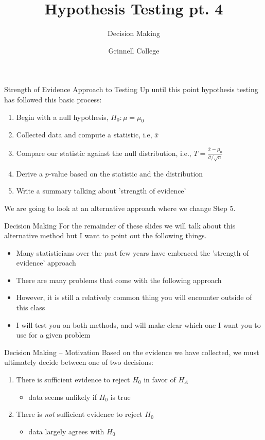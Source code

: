\documentclass{beamer}
\title[Introduction to Statistics]{Hypothesis Testing pt. 4}
\subtitle{Decision Making}
\author{Grinnell College}
\date{}
\begin{document}
\begin{frame}
  \titlepage
\end{frame}

\begin{frame}{Strength of Evidence Approach to Testing}
Up until this point hypothesis testing has followed this basic process:

\begin{enumerate}
\item Begin with a null hypothesis, $H_0: \mu = \mu_0$
\item Collected data and compute a statistic, i.e, $\overline{x}$
\item Compare our statistic against the null distribution, i.e., $T = \frac{\overline{x} - \mu_0}{\hat{\sigma}/\sqrt{n}}$
\item Derive a $p$-value based on the statistic and the distribution
\item Write a summary talking about 'strength of evidence'
\end{enumerate} \vspace{8mm}

We are going to look at an alternative approach where we change Step 5.
\end{frame}

\begin{frame}{Decision Making}
For the remainder of these slides we will talk about this alternative method but I want to point out the following things.
\begin{itemize}
    \item Many statisticians over the past few years have embraced the 'strength of evidence' approach
    \item There are many problems that come with the following approach
    \item However, it is still a relatively common thing you will encounter outside of this class
    \item I will test you on both methods, and will make clear which one I want you to use for a given problem
\end{itemize}
\end{frame}

\begin{frame}{Decision Making -- Motivation}
Based on the evidence we have collected, we must ultimately decide between one of two decisions:
\vspace{2mm}
\begin{enumerate}
\item There is sufficient evidence to reject $H_0$ in favor of $H_A$
\begin{itemize}
    \item data seems unlikely if $H_0$ is true
\end{itemize} \vspace{2mm}
\item There is \textit{not} sufficient evidence to reject $H_0$
\begin{itemize}
    \item data largely agrees with $H_0$
\end{itemize}
\end{enumerate}
\end{frame}
\end{document}
